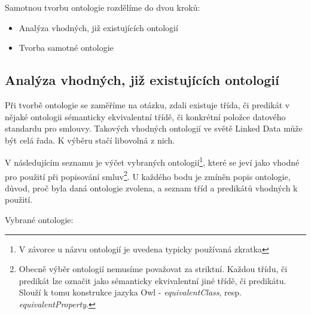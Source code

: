 \bigskip
\noindent
Samotnou tvorbu ontologie rozdělíme do dvou kroků:

\begin{itemize}
\item Analýza vhodných, již existujících ontologií
\item Tvorba samotné ontologie
\end{itemize}

\subsection{Analýza vhodných, již existujících ontologií}

Při tvorbě ontologie se zaměříme na otázku, zdali existuje třída, či predikát v nějaké ontologii sémanticky ekvivalentní třídě, či konkrétní položce datového standardu pro smlouvy. Takových vhodných ontologií ve světě Linked Data může být celá řada. K výběru stačí libovolná z nich. 

V následujícím seznamu je výčet vybraných ontologií\footnote{V závorce u názvu ontologií je uvedena typicky používaná zkratka}, které se jeví jako vhodné pro použití při popisování smluv\footnote{Obecně výběr ontologií nemusíme považovat za striktní. Každou třídu, či predikát lze označit jako sémanticky ekvivalentní jiné třídě, či predikátu. Slouží k tomu konstrukce jazyka Owl - \textit{equivalentClass}, resp. \textit{equivalentProperty}.}. U každého bodu je zmíněn popis ontologie, důvod, proč byla daná ontologie zvolena, a seznam tříd a predikátů vhodných k použití.

\bigskip
\noindent
Vybrané ontologie:

